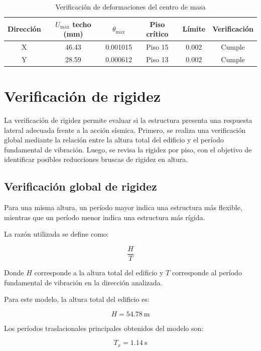 \begin{table}[H]
\centering
\caption{Verificación de deformaciones del centro de masa}
\begin{tabular}{cccccc}
\hline
Dirección & $U_{\max}$ techo (mm) & $\theta_{\max}$ & Piso crítico & Límite & Verificación \\
\hline
X & 46.43 & 0.001015 & Piso 15 & 0.002 & Cumple \\
Y & 28.59 & 0.000612 & Piso 13 & 0.002 & Cumple \\
\hline
\end{tabular}
\end{table}

\section{Verificación de rigidez}

La verificación de rigidez permite evaluar si la estructura presenta una respuesta lateral adecuada frente a la acción sísmica. Primero, se realiza una verificación global mediante la relación entre la altura total del edificio y el período fundamental de vibración. Luego, se revisa la rigidez por piso, con el objetivo de identificar posibles reducciones bruscas de rigidez en altura.

\subsection{Verificación global de rigidez}

Para una misma altura, un período mayor indica una estructura más flexible, mientras que un período menor indica una estructura más rígida.

La razón utilizada se define como:

\begin{equation}
\frac{H}{T}
\end{equation}

Donde $H$ corresponde a la altura total del edificio y $T$ corresponde al período fundamental de vibración en la dirección analizada.

Para este modelo, la altura total del edificio es:

\begin{equation}
H = 54.78 \ \text{m}
\end{equation}

Los períodos traslacionales principales obtenidos del modelo son:

\begin{equation}
T_x = 1.14 \ \text{s}
\end{equation}

